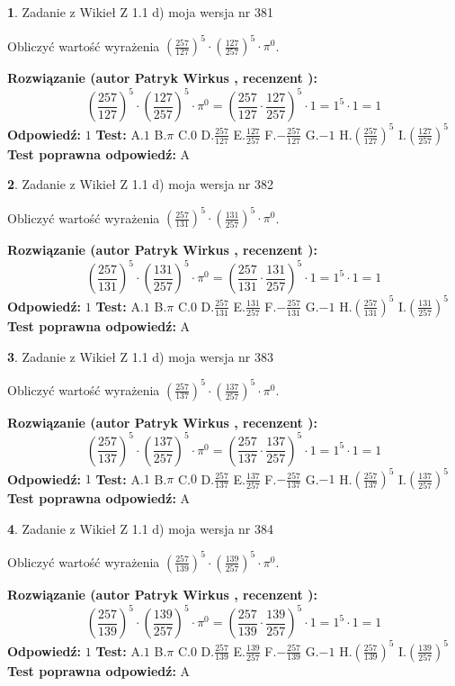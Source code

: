 \documentclass[12pt, a4paper]{article}
\theoremstyle{definition} %
\newtheorem{zad}{}
\newcommand{\zadStart}[1]{\begin{zad}#1\newline}
\newcommand{\zadStop}{\end{zad}}
\newcommand{\rozwStart}[2]{\noindent \textbf{Rozwiązanie (autor #1 , recenzent #2): }\newline}
\newcommand{\rozwStop}{\newline}
\newcommand{\odpStart}{\noindent \textbf{Odpowiedź:}\newline}
\newcommand{\odpStop}{\newline}
\newcommand{\testStart}{\noindent \textbf{Test:}\newline}
\newcommand{\testStop}{\newline}
\newcommand{\kluczStart}{\noindent \textbf{Test poprawna odpowiedź:}\newline}
\newcommand{\kluczStop}{\newline}
\begin{document}
\zadStart{Zadanie z Wikieł Z 1.1 d) moja wersja nr 381}

Obliczyć wartość wyrażenia $(\frac{257}{127})^{5} \cdot (\frac{127}{257})^{5} \cdot \pi^{0}$.
\zadStop
\rozwStart{Patryk Wirkus}{}
$$(\frac{257}{127})^{5} \cdot (\frac{127}{257})^{5} \cdot \pi^{0} = (\frac{257}{127} \cdot \frac{127}{257})^{5} \cdot 1 = 1^{5} \cdot 1 = 1$$
\rozwStop
\odpStart
$1$
\odpStop
\testStart
A.$1$ B.$\pi$ C.$0$ D.$\frac{257}{127}$ E.$\frac{127}{257}$
F.$-\frac{257}{127}$ G.$-1$
H.$(\frac{257}{127})^{5}$
I.$(\frac{127}{257})^{5}$
\testStop
\kluczStart
A
\kluczStop



\zadStart{Zadanie z Wikieł Z 1.1 d) moja wersja nr 382}

Obliczyć wartość wyrażenia $(\frac{257}{131})^{5} \cdot (\frac{131}{257})^{5} \cdot \pi^{0}$.
\zadStop
\rozwStart{Patryk Wirkus}{}
$$(\frac{257}{131})^{5} \cdot (\frac{131}{257})^{5} \cdot \pi^{0} = (\frac{257}{131} \cdot \frac{131}{257})^{5} \cdot 1 = 1^{5} \cdot 1 = 1$$
\rozwStop
\odpStart
$1$
\odpStop
\testStart
A.$1$ B.$\pi$ C.$0$ D.$\frac{257}{131}$ E.$\frac{131}{257}$
F.$-\frac{257}{131}$ G.$-1$
H.$(\frac{257}{131})^{5}$
I.$(\frac{131}{257})^{5}$
\testStop
\kluczStart
A
\kluczStop



\zadStart{Zadanie z Wikieł Z 1.1 d) moja wersja nr 383}

Obliczyć wartość wyrażenia $(\frac{257}{137})^{5} \cdot (\frac{137}{257})^{5} \cdot \pi^{0}$.
\zadStop
\rozwStart{Patryk Wirkus}{}
$$(\frac{257}{137})^{5} \cdot (\frac{137}{257})^{5} \cdot \pi^{0} = (\frac{257}{137} \cdot \frac{137}{257})^{5} \cdot 1 = 1^{5} \cdot 1 = 1$$
\rozwStop
\odpStart
$1$
\odpStop
\testStart
A.$1$ B.$\pi$ C.$0$ D.$\frac{257}{137}$ E.$\frac{137}{257}$
F.$-\frac{257}{137}$ G.$-1$
H.$(\frac{257}{137})^{5}$
I.$(\frac{137}{257})^{5}$
\testStop
\kluczStart
A
\kluczStop



\zadStart{Zadanie z Wikieł Z 1.1 d) moja wersja nr 384}

Obliczyć wartość wyrażenia $(\frac{257}{139})^{5} \cdot (\frac{139}{257})^{5} \cdot \pi^{0}$.
\zadStop
\rozwStart{Patryk Wirkus}{}
$$(\frac{257}{139})^{5} \cdot (\frac{139}{257})^{5} \cdot \pi^{0} = (\frac{257}{139} \cdot \frac{139}{257})^{5} \cdot 1 = 1^{5} \cdot 1 = 1$$
\rozwStop
\odpStart
$1$
\odpStop
\testStart
A.$1$ B.$\pi$ C.$0$ D.$\frac{257}{139}$ E.$\frac{139}{257}$
F.$-\frac{257}{139}$ G.$-1$
H.$(\frac{257}{139})^{5}$
I.$(\frac{139}{257})^{5}$
\testStop
\kluczStart
A
\kluczStop
\end{document}
